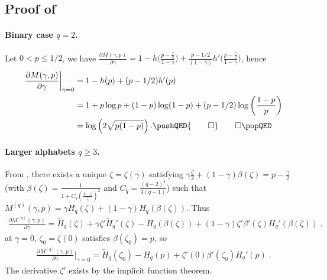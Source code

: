 \documentclass{article}
\theoremstyle{plain}
\theoremstyle{plain}
\theoremstyle{plain}
\theoremstyle{plain}
\theoremstyle{plain}
\theoremstyle{plain}
\theoremstyle{plain}
\theoremstyle{plain}
\theoremstyle{plain}
\theoremstyle{plain}
\theoremstyle{remark}
\theoremstyle{remark}
\theoremstyle{remark}
\theoremstyle{plain}
\begin{document}
\subsection{Proof of }

\paragraph{Binary case $q=2$.}
Let $0<p\le 1/2$, we have $\frac{\partial M(\gamma,p)}{\partial\gamma}=1-h\Big(\frac{p-\frac{\gamma}{2}}{1-\gamma}\Big)+\frac{p-1/2}{(1-\gamma)}h'\Big(\frac{p-\frac{\gamma}{2}}{1-\gamma}\Big)$, hence
\begin{align*}
\frac{\partial M(\gamma,p)}{\partial\gamma}\bigg\rvert_{\gamma=0}&=1-h(p)+(p-1/2)h'(p)
    \\&=1+p\log p+(1-p)\log(1-p)+(p-1/2)\log\left(\frac{1-p}{p}\right)
    \\&=\log\left(2\sqrt{p(1-p)}\right).
    \pushQED{\qed}\qedhere\popQED
\end{align*}

\paragraph{Larger alphabets $q\ge 3$.}
From , there exists a unique $\zeta=\zeta(\gamma)$ satisfying $\gamma\frac{\zeta}{2}+(1-\gamma)\beta(\zeta)=p-\frac{\gamma}{2}$ (with $\beta(\zeta)=\frac{1}{1+C_q(\frac{1-\zeta}{\zeta})^2}$ and $C_q=\frac{(q-2)^2}{4(q-1)}$) such that $M^{(q)}(\gamma,p)=\gamma\tilde{H}_q(\zeta)+(1-\gamma)H_q(\beta(\zeta))$. Thus
\begin{align*}
    \frac{\partial  M^{(q)}(\gamma,p)}{\partial \gamma}=\tilde{H}_q(\zeta)+\gamma\zeta'\tilde{H}_q'(\zeta)-H_q(\beta(\zeta))+(1-\gamma)\zeta'\beta'(\zeta)H_q'(\beta(\zeta))\;,
\end{align*}
at $\gamma=0$, $\zeta_0=\zeta(0)$ satisfies $\beta(\zeta_0)=p$, so
\begin{align*}
    \frac{\partial  M^{(q)}(\gamma,p)}{\partial \gamma}\bigg\rvert_{\gamma=0}=\tilde{H}_q(\zeta_0)-H_q(p)+\zeta'(0)\beta'(\zeta_0)H_q'(p)\;.
\end{align*}
The derivative $\zeta'$ exists by the
implicit function theorem.
\end{document}
